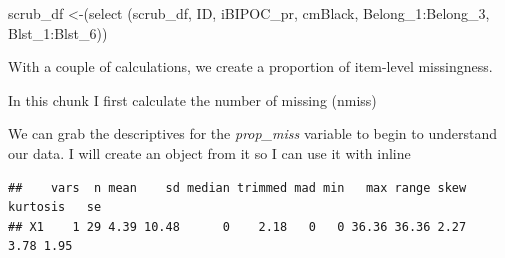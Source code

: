\documentclass[
  english,
]{book}
\newenvironment{Shaded}{\begin{snugshade}}{\end{snugshade}}
\newcommand{\AttributeTok}[1]{\textcolor[rgb]{0.77,0.63,0.00}{#1}}
\newcommand{\CommentTok}[1]{\textcolor[rgb]{0.56,0.35,0.01}{\textit{#1}}}
\newcommand{\DecValTok}[1]{\textcolor[rgb]{0.00,0.00,0.81}{#1}}
\newcommand{\FunctionTok}[1]{\textcolor[rgb]{0.00,0.00,0.00}{#1}}
\newcommand{\NormalTok}[1]{#1}
\newcommand{\OtherTok}[1]{\textcolor[rgb]{0.56,0.35,0.01}{#1}}
\newcommand{\SpecialCharTok}[1]{\textcolor[rgb]{0.00,0.00,0.00}{#1}}
\begin{document}
\begin{Shaded}
\begin{Highlighting}[]
\NormalTok{scrub\_df }\OtherTok{\textless{}{-}}\NormalTok{(}\FunctionTok{select}\NormalTok{ (scrub\_df, ID, iBIPOC\_pr, cmBlack, Belong\_1}\SpecialCharTok{:}\NormalTok{Belong\_3, Blst\_1}\SpecialCharTok{:}\NormalTok{Blst\_6))}
\end{Highlighting}
\end{Shaded}

With a couple of calculations, we create a proportion of item-level missingness.

In this chunk I first calculate the number of missing (nmiss)

\begin{Shaded}
\end{Shaded}

We can grab the descriptives for the \emph{prop\_miss} variable to begin to understand our data. I will create an object from it so I can use it with inline

\begin{Shaded}
\end{Shaded}

\begin{verbatim}
##    vars  n mean    sd median trimmed mad min   max range skew kurtosis   se
## X1    1 29 4.39 10.48      0    2.18   0   0 36.36 36.36 2.27     3.78 1.95
\end{verbatim}
\end{document}
